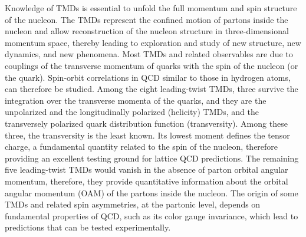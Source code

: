 \documentclass[12pt]{article}
\begin{document}
Knowledge of TMDs is essential to unfold the full momentum and spin structure of the nucleon.  The TMDs represent the confined motion of  
partons inside the nucleon and allow reconstruction of the
nucleon structure in three-dimensional momentum space, thereby leading to 
exploration and study of new structure, new dynamics, and new phenomena. 
 Most TMDs and related observables are due to couplings of the
transverse momentum of quarks with the spin of the nucleon (or the quark). 
Spin-orbit correlations in QCD similar to those in hydrogen atoms, 
can therefore be studied.
 Among the eight leading-twist TMDs, three survive the integration over the transverse momenta of the quarks, and they are the unpolarized and the
longitudinally polarized (helicity) TMDs, and the transversely polarized quark distribution function (transversity). Among these three, the transversity is the least known. Its lowest moment defines the tensor charge, a fundamental quantity related to the spin of the nucleon, therefore providing an excellent testing ground for lattice QCD predictions. 
 The remaining five leading-twist TMDs would vanish in the absence
of parton orbital angular momentum, therefore, they provide 
quantitative information about the orbital angular momentum (OAM) of the 
partons inside the nucleon.  
The origin of some TMDs and related spin asymmetries, at the partonic level, depends on fundamental properties of QCD, such as its color gauge invariance, which lead to predictions that can be tested experimentally. 
\end{document}
